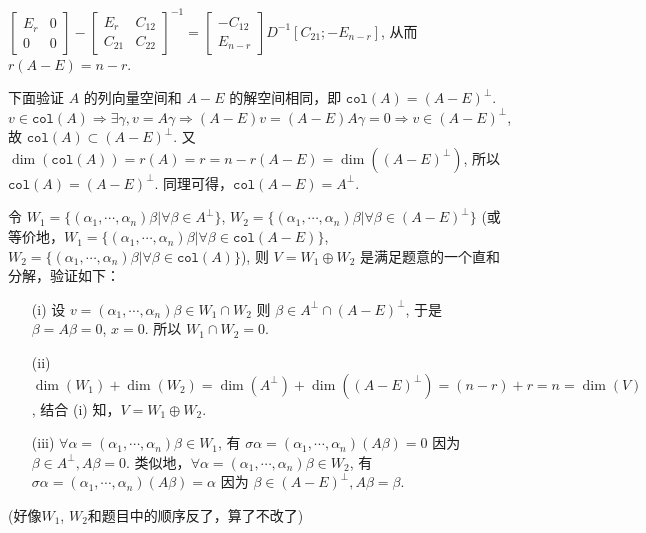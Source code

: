 \documentclass{article}
\begin{document}
\begin{spacing}{1.5}
\begin{enumerate}
\begin{itemize}
\begin{itemize}
            $\left[\begin{array}{cc}E_r&0\\0&0\end{array}\right] - \left[\begin{array}{cc}E_r&C_{12}\\C_{21}&C_{22}\end{array}\right]^{-1}=\left[\begin{array}{c}-C_{12}\\E_{n-r}\end{array}\right] D^{-1} \left[C_{21}; -E_{n-r}\right]$, 从而 $r(A-E) = n-r$.

            下面验证 $A$ 的列向量空间和 $A-E$ 的解空间相同，即 $\mathtt{col}(A) = (A-E)^\perp$. $v\in \mathtt{col}(A)\Rightarrow \exists \gamma, v = A\gamma \Rightarrow (A-E)v = (A-E)A\gamma = 0 \Rightarrow v\in (A-E)^\perp$, 故 $\mathtt{col}(A)\subset (A-E)^\perp$. 又 $\dim(\mathtt{col}(A)) = r(A) = r = n - r(A-E) = \dim\left((A-E)^\perp\right)$, 所以 $\mathtt{col}(A) = (A-E)^\perp$. 同理可得，$\mathtt{col}(A-E) = A^\perp$.

            令 $W_1 = \{(\alpha_1,\cdots,\alpha_n)\beta | \forall \beta\in A^{\perp}\}$, $W_2 = \{(\alpha_1, \cdots, \alpha_n)\beta | \forall \beta\in (A-E)^\perp\}$ (或等价地，$W_1 = \{(\alpha_1,\cdots,\alpha_n)\beta | \forall \beta\in \mathtt{col}(A-E)\}$, $W_2 = \{(\alpha_1, \cdots, \alpha_n)\beta | \forall \beta\in \mathtt{col}(A)\}$), 则 $V = W_1 \oplus W_2$ 是满足题意的一个直和分解，验证如下：
            \begin{itemize}
                \item [(i)] 设 $v = (\alpha_1,\cdots,\alpha_n)\beta\in W_1\cap W_2$ 则 $\beta \in A^\perp \cap (A-E)^\perp$, 于是 $\beta = A\beta = 0$, $x = 0$. 所以 $W_1 \cap W_2 = 0$.
                \item [(ii)] $\dim(W_1) + \dim(W_2) = \dim(A^\perp) + \dim((A-E)^\perp) = (n - r) + r = n = \dim (V)$, 结合 (i) 知，$V = W_1 \oplus W_2$.
                \item [(iii)] $\forall \alpha = (\alpha_1,\cdots,\alpha_n)\beta\in W_1$, 有 $\sigma \alpha = (\alpha_1,\cdots,\alpha_n) (A\beta) = 0$ 因为 $\beta\in A^\perp, A\beta=0$. 类似地，$\forall \alpha = (\alpha_1,\cdots,\alpha_n)\beta \in W_2$, 有 $\sigma \alpha = (\alpha_1, \cdots, \alpha_n) (A\beta) = \alpha$ 因为 $\beta\in (A-E)^\perp, A\beta = \beta$. 
            \end{itemize}
            (好像$W_1$, $W_2$和题目中的顺序反了，算了不改了)
        \end{itemize}
    \end{itemize}


\end{enumerate}
\end{spacing}
\end{document}
